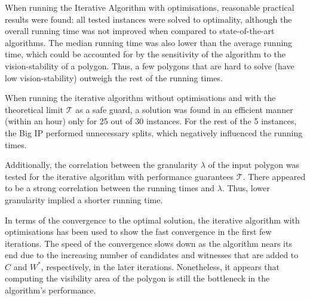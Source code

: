 When running the Iterative Algorithm with optimisations, reasonable practical results were found: all tested instances were solved to optimality, although the overall running time was not improved when compared to state-of-the-art algorithms. The median running time was also lower than the average running time, which could be accounted for by the sensitivity of the algorithm to the vision-stability of a polygon. Thus, a few polygons that are hard to solve (have low vision-stability) outweigh the rest of the running times.

When running the iterative algorithm without optimisations and with the theoretical limit $\mathcal T$ as a safe guard, a solution was found in an efficient manner (within an hour) only for 25 out of 30 instances. For the rest of the 5 instances, the Big IP performed unnecessary splits, which negatively influenced the running times.

Additionally, the correlation between the granularity $\lambda$ of the input polygon was tested for the iterative algorithm with performance guarantees $\mathcal T$. There appeared to be a strong correlation between the running times and $\lambda$. Thus, lower granularity implied a shorter running time.

In terms of the convergence to the optimal solution, the iterative algorithm with optimisations has been used to show the fast convergence in the first few iterations. The speed of the convergence slows down as the algorithm nears its end due to the increasing number of candidates and witnesses that are added to $C$ and $W^*$, respectively, in the later iterations. Nonetheless, it appears that computing the visibility area of the polygon is still the bottleneck in the algorithm's performance.



